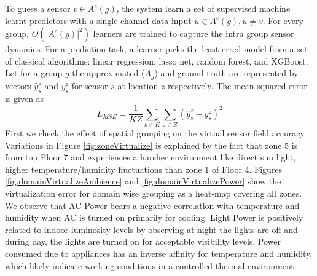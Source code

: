 To guess a sensor $v \in A^c(g)$, the system learn a set of supervised machine learnt predictors with a single channel data input $u \in A^c(g), u \neq v$.
For every group, $O(|A^c(g)|^2)$ learners are trained to capture the intra group sensor dynamics. 
For a prediction task, a learner picks the least erred model from a set of classical algorithms:  linear regression, lasso net, random forest, and XGBoost.
Let for a group $g$ the approximated ($A_g$) and ground truth are represented by vectors $\hat{y}^z_s$ and $y^z_s$ for sensor $s$ at location $z$ respectively. 
The mean squared error is given as
\begin{equation*}
L_{MSE} =\frac{1}{KZ}\sum_{k \in K} \sum_{z \in Z} (\hat{y}^z_s - y^z_s)^2 
\end{equation*}
First we check the effect of spatial grouping on the virtual sensor field accuracy.
Variations in Figure \ref{fig:zoneVirtualize} is explained by the fact that zone 5 is from top Floor 7 and experiences a harsher environment like direct sun light, higher temperature/humidity fluctuations than zone 1 of Floor 4.
Figures \ref{fig:domainVirtualizeAmbience} and \ref{fig:domainVirtualizePower} show the  virtualization error for domain wise grouping as a heat-map covering all zones.
 We observe that AC Power bears a negative correlation with temperature and humidity when AC is turned on primarily for cooling.
Light Power is positively related to indoor luminosity levels by observing at night the lights are off and during day, the lights are turned on for acceptable visibility levels.
Power consumed due to appliances has an inverse affinity for temperature and humidity, which likely indicate working conditions in a controlled thermal environment.

